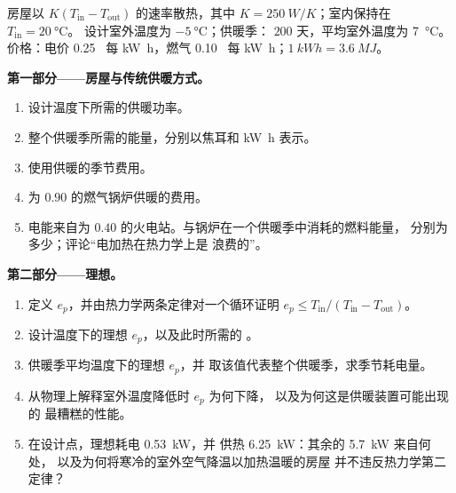 \begin{problem}
\label{pb:b1:heat-engines:1}
房屋以 $K(T_{\mathrm{in}} - T_{\mathrm{out}})$ 的速率散热，其中
$K = \qty{250}{W/K}$；室内保持在 $T_{\mathrm{in}} = \qty{20}{\degreeCelsius}$。
设计室外温度为 $\qty{-5}{\degreeCelsius}$；供暖季：
$200$ 天，平均室外温度为 \qty{7}{\degreeCelsius}。
价格：电价 0.25~\texteuro{} 每 \unit{kW h}，燃气 0.10~\texteuro{} 每
\unit{kW h}；$\qty{1}{kW h} = \qty{3.6}{MJ}$。

\medskip
\noindent\textbf{第一部分——房屋与传统供暖方式。}
\begin{enumerate}
  \item 设计温度下所需的供暖功率。
  \item 整个供暖季所需的能量，分别以焦耳和 \unit{kW h} 表示。
  \item 使用供暖的季节费用。
  \item {}为 $0.90$ 的燃气锅炉供暖的费用。
  \item 电能来自为
        $0.40$ 的火电站。与锅炉在一个供暖季中消耗的燃料能量，
        分别为多少；评论“电加热在热力学上是
        浪费的”。
\end{enumerate}

\medskip
\noindent\textbf{第二部分——理想。}
\begin{enumerate}[resume]
  \item 定义 $e_p$，并由热力学两条定律对一个循环证明
        $e_p \leq T_{\mathrm{in}}/(T_{\mathrm{in}} - T_{\mathrm{out}})$。
  \item 设计温度下的理想 $e_p$，以及此时所需的
        。
  \item 供暖季平均温度下的理想 $e_p$，并
        取该值代表整个供暖季，求季节耗电量。
  \item 从物理上解释室外温度降低时 $e_p$ 为何下降，
        以及为何这是供暖装置可能出现的
        最糟糕的性能。
  \item 在设计点，理想耗电 \qty{0.53}{kW}，并
        供热 \qty{6.25}{kW}：其余的 \qty{5.7}{kW} 来自何处，
        以及为何将寒冷的室外空气降温以加热温暖的房屋
        并不违反热力学第二定律？
\end{enumerate}


\end{problem}
